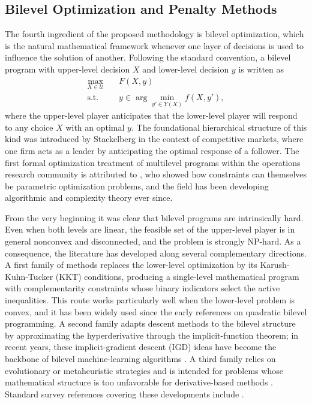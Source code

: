 \subsection{Bilevel Optimization and Penalty Methods}
The fourth ingredient of the proposed methodology is bilevel optimization, which is the natural mathematical framework whenever one layer of decisions is used to influence the solution of another. Following the standard convention, a bilevel program with upper-level decision $X$ and lower-level decision $y$ is written as
\begin{align}
\max_{X\in\mathcal{U}} \quad & F(X,y) \label{eq:bilevel_upper_sota}\\
\text{s.t.}\quad & y\in\arg\min_{y'\in Y(X)} f(X,y'),
\label{eq:bilevel_lower_sota}
\end{align}
where the upper-level player anticipates that the lower-level player will respond to any choice $X$ with an optimal $y$. The foundational hierarchical structure of this kind was introduced by Stackelberg \cite{vonStackelberg1934,vonStackelberg2011} in the context of competitive markets, where one firm acts as a leader by anticipating the optimal response of a follower. The first formal optimization treatment of multilevel programs within the operations research community is attributed to \cite{BrackenMcGill1973}, who showed how constraints can themselves be parametric optimization problems, and the field has been developing algorithmic and complexity theory ever since.

From the very beginning it was clear that bilevel programs are intrinsically hard. Even when both levels are linear, the feasible set of the upper-level player is in general nonconvex and disconnected, and the problem is strongly NP-hard. As a consequence, the literature has developed along several complementary directions. A first family of methods replaces the lower-level optimization by its Karush-Kuhn-Tucker (KKT) conditions, producing a single-level mathematical program with complementarity constraints whose binary indicators select the active inequalities. This route works particularly well when the lower-level problem is convex, and it has been widely used since the early references on quadratic bilevel programming. A second family adapts descent methods to the bilevel structure by approximating the hyperderivative through the implicit-function theorem; in recent years, these implicit-gradient descent (IGD) ideas have become the backbone of bilevel machine-learning algorithms \cite{LuMei2024,Jiang2024Primal,GhadimiWang2018}. A third family relies on evolutionary or metaheuristic strategies and is intended for problems whose mathematical structure is too unfavorable for derivative-based methods \cite{SinhaMaloDeb2018}. Standard survey references covering these developments include \cite{Bard1998,ColsonMarcotteSavard2007,Dempe2002,SinhaMaloDeb2018}.

